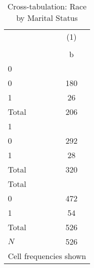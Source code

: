 \begin{table}[htbp]\centering
\def\sym#1{\ifmmode^{#1}\else\(^{#1}\)\fi}
\caption{Cross-tabulation: Race by Marital Status}\label{tab:0201-crosstab_race_married}
\begin{tabular}{l*{1}{c}}
\toprule
            &\multicolumn{1}{c}{(1)}\\
            &\multicolumn{1}{c}{}\\
            &           b\\
\midrule
0           &            \\
0           &         180\\
1           &          26\\
Total       &         206\\
\midrule
1           &            \\
0           &         292\\
1           &          28\\
Total       &         320\\
\midrule
Total       &            \\
0           &         472\\
1           &          54\\
Total       &         526\\
\midrule
\(N\)       &         526\\
\bottomrule
\multicolumn{2}{l}{\footnotesize Cell frequencies shown}\\
\end{tabular}
\end{table}
